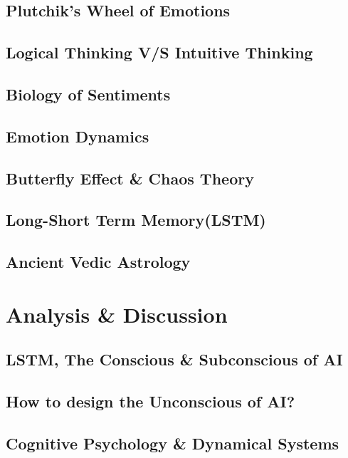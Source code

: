 \documentclass[12pt, a4paper]{article}
\begin{document}
\begin{multicols}{2}
		\subsection{Plutchik's Wheel of Emotions}
		
		\subsection{Logical Thinking V/S Intuitive Thinking}
		
		\subsection{Biology of Sentiments}
		
		\subsection{Emotion Dynamics}
		
		\subsection{Butterfly Effect \& Chaos Theory}
		
		\subsection{Long-Short Term Memory(LSTM)}
		
		\subsection{Ancient Vedic Astrology}
		
		\section{Analysis \& Discussion}
		\subsection{LSTM, The Conscious \& Subconscious of AI}
		\subsection{How to design the Unconscious of AI?}
		\subsection{Cognitive Psychology \& Dynamical Systems}
		

\end{multicols}
\end{document}
